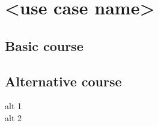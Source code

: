 \section{<use case name>}

\subsection{Basic course}

\subsection{Alternative course}
\begin{description}
\item[alt 1]
\item[alt 2]
\end{description}
